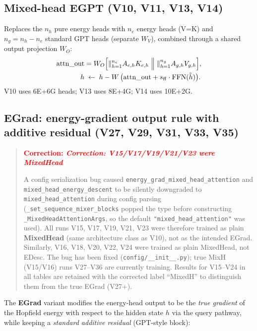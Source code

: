 \documentclass[11pt,a4paper]{article}
\begin{document}
\subsection{Mixed-head EGPT (V10, V11, V13, V14)}

Replaces the $n_h$ pure energy heads with $n_e$ energy heads (V=K) and
$n_g = n_h - n_e$ standard GPT heads (separate $W_V$), combined through a shared
output projection $W_O$:
\begin{align}
  \mathrm{attn\_out} &= W_O\Bigl[\|_{h=1}^{n_e} A_{e,h} K_{e,h}
    \;\Big\|\; \|_{h=1}^{n_g} A_{g,h} V_{g,h}\Bigr],
  \label{eq:mixed_attn}\\
  h &\;\leftarrow\; h - W\,\bigl(\mathrm{attn\_out} + s_{\mathrm{ff}}\cdot\mathrm{FFN}(\tilde{h})\bigr).
  \label{eq:mixed_update}
\end{align}
V10 uses 6E+6G heads; V13 uses 8E+4G; V14 uses 10E+2G.

\subsection{EGrad: energy-gradient output rule with additive residual (V27, V29, V31, V33, V35)}
\label{sec:egrad}

\begin{quote}\textbf{\textcolor{red}{Correction: \textit{Correction: V15/V17/V19/V21/V23 were MixedHead}}}\par\smallskip
A config serialization bug caused \texttt{energy\_grad\_mixed\_head\_attention} and
\texttt{mixed\_head\_energy\_descent} to be silently downgraded to
\texttt{mixed\_head\_attention} during config parsing (\texttt{\_set\_sequence\_mixer\_blocks}
popped the type before constructing \texttt{\_MixedHeadAttentionArgs}, so the default
\texttt{"mixed\_head\_attention"} was used).
All runs V15, V17, V19, V21, V23 were therefore trained as plain \textbf{MixedHead}
(same architecture class as V10), not as the intended EGrad.
Similarly, V16, V18, V20, V22, V24 were trained as plain MixedHead, not EDesc.
The bug has been fixed (\texttt{config/\_\_init\_\_.py}); true MixH (V15/V16) runs
V27--V36 are currently training.  Results for V15--V24 in all tables are retained
with the corrected label ``MixedH'' to distinguish them from the true EGrad (V27+).
\end{quote}

The \textbf{EGrad} variant modifies the energy-head output to be the
\emph{true gradient} of the Hopfield energy with respect to the hidden state $h$
via the query pathway, while keeping a \emph{standard additive residual} (GPT-style block):
\end{document}
